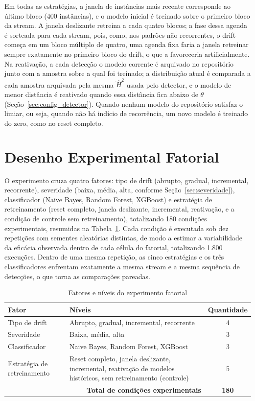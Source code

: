 Em todas as estratégias, a janela de instâncias mais recente corresponde ao
último bloco (400 instâncias), e o modelo inicial é treinado sobre o primeiro
bloco da stream. A janela deslizante retreina a cada quatro blocos; a fase
dessa agenda é sorteada para cada stream, pois, como, nos padrões não recorrentes, o drift começa em um
bloco múltiplo de quatro, uma agenda fixa faria a janela retreinar sempre
exatamente no primeiro bloco do drift, o que a favoreceria artificialmente. Na
reativação, a cada detecção o modelo corrente é arquivado no repositório
junto com a amostra sobre a qual foi treinado; a distribuição atual é
comparada a cada amostra arquivada pela mesma $\hat{H}^2$ usada pelo
detector, e o modelo de menor distância é reativado quando essa distância
fica abaixo de $\theta$ (Seção~\ref{sec:config_detector}). Quando nenhum
modelo do repositório satisfaz o limiar, ou seja, quando não há indício de
recorrência, um novo modelo é treinado do zero, como no reset completo.

\section{Desenho Experimental Fatorial}
\label{sec:fatorial}
O experimento cruza quatro fatores: tipo de drift (abrupto, gradual,
incremental, recorrente), severidade (baixa, média, alta, conforme
Seção~\ref{sec:severidade}), classificador (Naive Bayes, Random Forest,
XGBoost) e estratégia de retreinamento (reset completo, janela deslizante,
incremental, reativação, e a condição de controle sem retreinamento),
totalizando 180 condições experimentais, resumidas
na Tabela~\ref{tab:fatorial}. Cada condição é executada sob dez
repetições com sementes aleatórias distintas, de modo a estimar a
variabilidade da eficácia observada dentro de cada célula do fatorial,
totalizando 1.800 execuções. Dentro de uma mesma repetição, as cinco
estratégias e os três classificadores enfrentam exatamente a mesma stream e
a mesma sequência de detecções, o que torna as comparações pareadas.

\begin{table}[h]
\centering
\caption{Fatores e níveis do experimento fatorial}
\label{tab:fatorial}
\begin{tabular}{lp{7cm}c}
\toprule
\textbf{Fator} & \textbf{Níveis} & \textbf{Quantidade} \\
\midrule
Tipo de drift & Abrupto, gradual, incremental, recorrente & 4 \\
Severidade & Baixa, média, alta & 3 \\
Classificador & Naive Bayes, Random Forest, XGBoost & 3 \\
Estratégia de retreinamento & Reset completo, janela deslizante,
incremental, reativação de modelos históricos, sem retreinamento
(controle) & 5 \\
\midrule
\multicolumn{2}{r}{\textbf{Total de condições experimentais}} & \textbf{180} \\
\bottomrule
\end{tabular}
\end{table}

